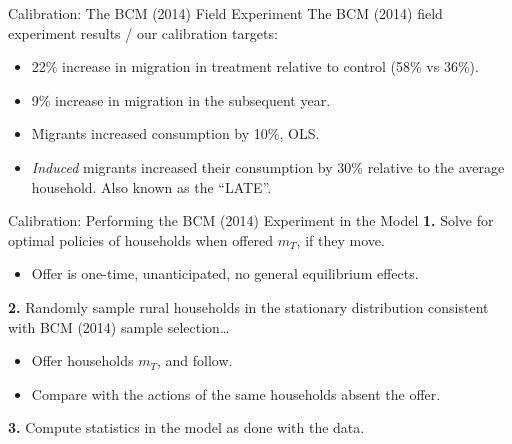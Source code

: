 \documentclass[9pt,pdftex,aspectratio=1610]{beamer}
\theoremstyle{definition}
\begin{document}

\begin{frame}[t]{Calibration: The BCM (2014) Field Experiment}
The BCM (2014) field experiment results / our calibration targets:
\begin{itemize}
\smallskip
\item 22\% increase in migration in treatment relative to control (58\% vs 36\%).
\smallskip
\item 9\% increase in migration in the subsequent year.
\smallskip
\item Migrants increased consumption by 10\%, OLS.
\smallskip
\item \emph{Induced} migrants increased their consumption by 30\% relative to the average household. Also known as the ``LATE''.
\end{itemize}
\end{frame}


\begin{frame}[t]{Calibration: Performing the BCM (2014) Experiment in the Model}
\textbf{1.} Solve for optimal policies of households when offered $m_T$, if they move.
\begin{itemize}
\smallskip
\item Offer is one-time, unanticipated, no general equilibrium effects.
\end{itemize}
\bigskip
\textbf{2.} Randomly sample rural households in the stationary distribution consistent with BCM (2014) sample selection\ldots
\begin{itemize}
\smallskip
\item Offer households $m_T$, and follow.
\smallskip
\item Compare with the actions of the same households absent the offer.
\end{itemize}
\bigskip
\textbf{3.} Compute statistics in the model as done with the data.
\end{frame}

\end{document}
